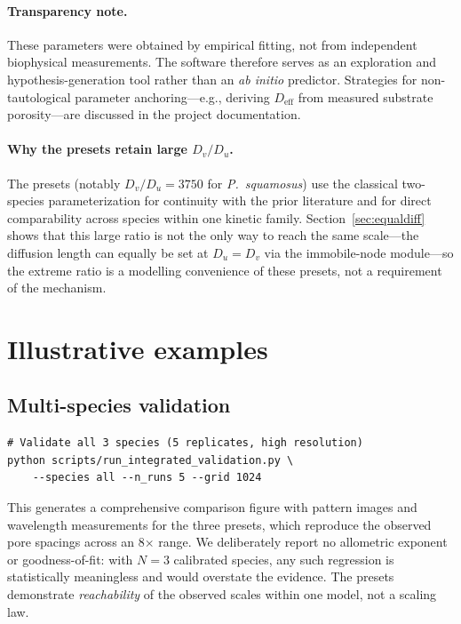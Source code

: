 \documentclass[review,3p]{elsarticle}
\begin{document}
\paragraph{Transparency note.}
These parameters were obtained by empirical fitting, not from
independent biophysical measurements. The software therefore serves as
an exploration and hypothesis-generation tool rather than an
\emph{ab initio} predictor. Strategies for non-tautological parameter
anchoring---e.g., deriving $D_\text{eff}$ from measured substrate
porosity---are discussed in the project documentation.

\paragraph{Why the presets retain large $D_v/D_u$.}
The presets (notably $D_v/D_u = 3750$ for \textit{P.~squamosus}) use the
classical two-species parameterization for continuity with the prior
literature and for direct comparability across species within one kinetic
family. Section~\ref{sec:equaldiff} shows that this large ratio is not the
only way to reach the same scale---the diffusion length can equally be set
at $D_u = D_v$ via the immobile-node module---so the extreme ratio is a
modelling convenience of these presets, not a requirement of the mechanism.


\section{Illustrative examples}
\label{sec:examples}

\subsection{Multi-species validation}

\begin{lstlisting}[caption={Full validation suite.},label=lst:validation]
# Validate all 3 species (5 replicates, high resolution)
python scripts/run_integrated_validation.py \
    --species all --n_runs 5 --grid 1024
\end{lstlisting}

This generates a comprehensive comparison figure with pattern images and
wavelength measurements for the three presets, which reproduce the
observed pore spacings across an 8$\times$ range. We deliberately report
no allometric exponent or goodness-of-fit: with $N = 3$ calibrated
species, any such regression is statistically meaningless and would
overstate the evidence. The presets demonstrate \emph{reachability} of
the observed scales within one model, not a scaling law.
\end{document}
